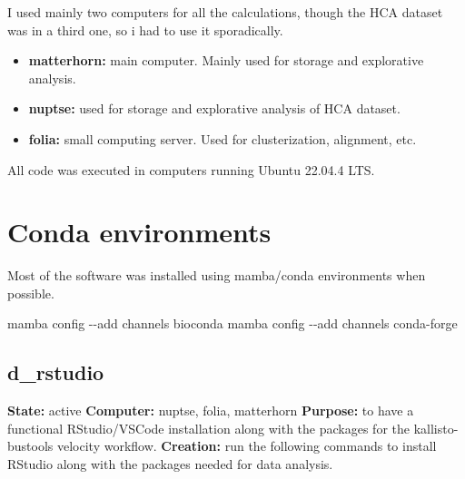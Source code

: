 \documentclass[
  letterpaper,
  DIV=11,
  numbers=noendperiod]{scrreprt}
\newenvironment{Shaded}{\begin{snugshade}}{\end{snugshade}}
\newcommand{\NormalTok}[1]{\textcolor[rgb]{0.00,0.23,0.31}{#1}}
\providecommand{\tightlist}{%
  \setlength{\itemsep}{0pt}\setlength{\parskip}{0pt}}\usepackage{longtable,booktabs,array}
\begin{document}
I used mainly two computers for all the calculations, though the HCA
dataset was in a third one, so i had to use it sporadically.

\begin{itemize}
\tightlist
\item
  \textbf{matterhorn:} main computer. Mainly used for storage and
  explorative analysis.
\item
  \textbf{nuptse:} used for storage and explorative analysis of HCA
  dataset.
\item
  \textbf{folia:} small computing server. Used for clusterization,
  alignment, etc.
\end{itemize}

All code was executed in computers running Ubuntu 22.04.4 LTS.

\section{Conda environments}\label{conda-environments}

Most of the software was installed using mamba/conda environments when
possible.

\begin{Shaded}
\begin{Highlighting}[]
\NormalTok{mamba config {-}{-}add channels bioconda}
\NormalTok{mamba config {-}{-}add channels conda{-}forge}
\end{Highlighting}
\end{Shaded}

\subsection{d\_rstudio}\label{d_rstudio}

\textbf{State:} active \textbf{Computer:} nuptse, folia, matterhorn
\textbf{Purpose:} to have a functional RStudio/VSCode installation along
with the packages for the kallisto-bustools velocity workflow.
\textbf{Creation:} run the following commands to install RStudio along
with the packages needed for data analysis.
\end{document}
